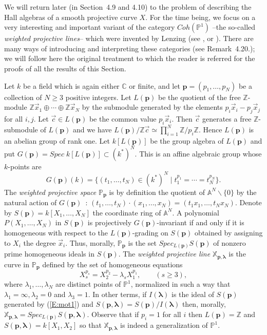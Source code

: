 \documentclass[a4paper,10pt]{amsart}
\def\Z{\mathbb{Z}}
\def\C{\mathbb{C}}
\def\p{\mathbf{p}}
\def\xpl{\mathbb{X}_{\mathbf{p},\boldsymbol{\lambda}}}
\def\llambda{\boldsymbol{\lambda}}
\numberwithin{equation}{section}
\begin{document}
{\vspace{.15in}

We will return later (in Section~4.9 and 4.10) to the problem of describing the Hall algebras of a smooth projective curve $X$. For the time being, we focus on a very interesting and important variant of the category $Coh(\mathbb{P}^1)$ --the so-called \textit{weighted projective lines}-- which were invented by Lenzing (see \cite{Lenzing1}, or \cite{Lenzingnotes}). There are many ways of introducing and interpreting these categories (see Remark~4.20.); we will follow here the original treatment \cite{GL} to which the reader is referred for the proofs of all the results of this Section.

\vspace{.15in}

Let $k$ be a field which is again either $\C$ or finite, and let $\mathbf{p}=(p_1, \ldots, p_N)$ be a collection of $N \geq 3$ positive integers. Let $L(\mathbf{p})$ be the quotient of the free $\Z$-module $\Z\vec{x}_1 \oplus \cdots \oplus \Z \vec{x}_N$ by the submodule generated by the elements $p_i \vec{x}_i-p_j\vec{x}_j$ for all $i,j$. Let $\vec{c} \in L(\mathbf{p})$ be the common value $p_i\vec{x}_i$. Then $\vec{c}$ generates a free $\Z$-submodule of $L(\mathbf{p})$ and we have $L(\mathbf{p})/\Z\vec{c} \simeq \prod_{i=1}^N \Z/p_i\Z$. Hence $L(\mathbf{p})$ is an abelian group of rank one. Let $k[L(\mathbf{p})]$ be the group algebra of $L(\mathbf{p})$ and put $G(\mathbf{p})=Spec\;k[L(\mathbf{p})] \subset (k^*)^N$. This is an affine algebraic group whose $k$-points are
$$G(\mathbf{p})(k)=\{(t_1, \ldots, t_N) \in (k^*)^N\;|\; t_1^{p_1}=\cdots=t_N^{p_N}\}.$$
The \textit{weighted projective space} $\mathbb{P}_{\mathbf{p}}$ is by definition the quotient of $\mathbb{A}^N\backslash\{0\}$ by the natural action of $G(\mathbf{p})$~: $(t_1, \ldots, t_N) \cdot (x_1, \ldots, x_N)=(t_1x_1, \ldots, t_Nx_N)$. Denote by $S(\mathbf{p})=k[X_1, \ldots, X_N]$ the coordinate ring of $\mathbb{A}^N$. A polynomial $P(X_1, \ldots, X_N)$ in $S(\mathbf{p})$ is projectively $G(\mathbf{p})$-invariant if and only if it is homogeneous with respect to the $L(\mathbf{p})$-grading on $S(\mathbf{p})$ obtained by assigning to $X_i$ the degree $\vec{x}_i$. Thus, morally, $\mathbb{P}_{\mathbf{p}}$ is the set $Spec_{L(\mathbf{p})}S(\mathbf{p})$ of nonzero prime homogeneous ideals  in $S(\mathbf{p})$. The \textit{weighted projective line} $\mathbb{X}_{\mathbf{p},\boldsymbol{\lambda}}$ is the curve in $\mathbb{P}_{\mathbf{p}}$ defined by the set of homogeneous equations
\begin{equation}\label{E:mot1}
X_s^{p_s}=X_2^{p_2}-\lambda_s X_1^{p_1}, \qquad (s \geq 3),
\end{equation}
where $\lambda_1, \ldots, \lambda_N$ are distinct points of $\mathbb{P}^1$, normalized in such a way that $\lambda_1=\infty, \lambda_2=0$ and $\lambda_3=1$. In other terms, if $I(\llambda)$ is the ideal of $S(\p)$ generated by (\ref{E:mot1}) and $S(\p,\llambda)=S(\p)/I(\llambda)$ then, morally, $\xpl=Spec_{L(\mathbf{p})}S(\p,\llambda)$. Observe that if $p_i=1$ for all $i$ then $L(\p)=\Z$ and $S(\p,\llambda)=k[X_1,X_2]$ so that $\xpl$ is indeed a generalization of $\mathbb{P}^1$.

}
\end{document}
